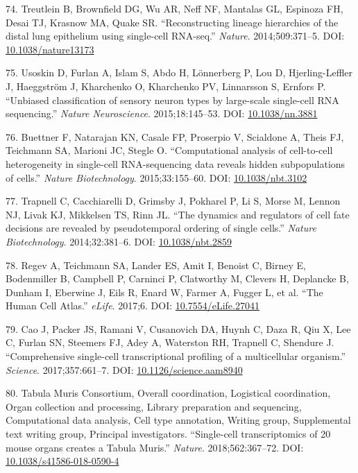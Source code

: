 \documentclass[11pt,a4paper,titlepage,twoside,openright]{style/unimelbthesis}
\theoremstyle{definition}
\theoremstyle{definition}
\theoremstyle{definition}
\theoremstyle{remark}
\begin{document}
\begin{mainmatter}
\leavevmode\hypertarget{ref-Treutlein2014-wd}{}%
74. Treutlein B, Brownfield DG, Wu AR, Neff NF, Mantalas GL, Espinoza FH, Desai TJ, Krasnow MA, Quake SR. ``Reconstructing lineage hierarchies of the distal lung epithelium using single-cell RNA-seq.'' \emph{Nature}. 2014;509:371--5. DOI: \href{https://doi.org/10.1038/nature13173}{10.1038/nature13173}

\leavevmode\hypertarget{ref-Usoskin2015-fz}{}%
75. Usoskin D, Furlan A, Islam S, Abdo H, Lönnerberg P, Lou D, Hjerling-Leffler J, Haeggström J, Kharchenko O, Kharchenko PV, Linnarsson S, Ernfors P. ``Unbiased classification of sensory neuron types by large-scale single-cell RNA sequencing.'' \emph{Nature Neuroscience}. 2015;18:145--53. DOI: \href{https://doi.org/10.1038/nn.3881}{10.1038/nn.3881}

\leavevmode\hypertarget{ref-Buettner2015-rq}{}%
76. Buettner F, Natarajan KN, Casale FP, Proserpio V, Scialdone A, Theis FJ, Teichmann SA, Marioni JC, Stegle O. ``Computational analysis of cell-to-cell heterogeneity in single-cell RNA-sequencing data reveals hidden subpopulations of cells.'' \emph{Nature Biotechnology}. 2015;33:155--60. DOI: \href{https://doi.org/10.1038/nbt.3102}{10.1038/nbt.3102}

\leavevmode\hypertarget{ref-Trapnell2014-he}{}%
77. Trapnell C, Cacchiarelli D, Grimsby J, Pokharel P, Li S, Morse M, Lennon NJ, Livak KJ, Mikkelsen TS, Rinn JL. ``The dynamics and regulators of cell fate decisions are revealed by pseudotemporal ordering of single cells.'' \emph{Nature Biotechnology}. 2014;32:381--6. DOI: \href{https://doi.org/10.1038/nbt.2859}{10.1038/nbt.2859}

\leavevmode\hypertarget{ref-Regev2017-tz}{}%
78. Regev A, Teichmann SA, Lander ES, Amit I, Benoist C, Birney E, Bodenmiller B, Campbell P, Carninci P, Clatworthy M, Clevers H, Deplancke B, Dunham I, Eberwine J, Eils R, Enard W, Farmer A, Fugger L, et al. ``The Human Cell Atlas.'' \emph{eLife}. 2017;6. DOI: \href{https://doi.org/10.7554/eLife.27041}{10.7554/eLife.27041}

\leavevmode\hypertarget{ref-Cao2017-ig}{}%
79. Cao J, Packer JS, Ramani V, Cusanovich DA, Huynh C, Daza R, Qiu X, Lee C, Furlan SN, Steemers FJ, Adey A, Waterston RH, Trapnell C, Shendure J. ``Comprehensive single-cell transcriptional profiling of a multicellular organism.'' \emph{Science}. 2017;357:661--7. DOI: \href{https://doi.org/10.1126/science.aam8940}{10.1126/science.aam8940}

\leavevmode\hypertarget{ref-Tabula_Muris_Consortium2018-pb}{}%
80. Tabula Muris Consortium, Overall coordination, Logistical coordination, Organ collection and processing, Library preparation and sequencing, Computational data analysis, Cell type annotation, Writing group, Supplemental text writing group, Principal investigators. ``Single-cell transcriptomics of 20 mouse organs creates a Tabula Muris.'' \emph{Nature}. 2018;562:367--72. DOI: \href{https://doi.org/10.1038/s41586-018-0590-4}{10.1038/s41586-018-0590-4}


\end{mainmatter}
\end{document}
